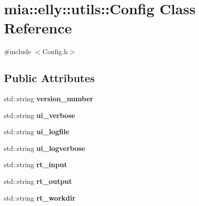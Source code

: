 \hypertarget{classmia_1_1elly_1_1utils_1_1_config}{\section{mia\-:\-:elly\-:\-:utils\-:\-:Config Class Reference}
\label{classmia_1_1elly_1_1utils_1_1_config}
}


{\ttfamily \#include $<$Config.\-h$>$}

\subsection*{Public Attributes}
\begin{DoxyCompactItemize}
\item 
\hypertarget{classmia_1_1elly_1_1utils_1_1_config_a39bcb2abda96acaf66b1c176e6ce63cb}{std\-::string {\bfseries version\-\_\-number}}\label{classmia_1_1elly_1_1utils_1_1_config_a39bcb2abda96acaf66b1c176e6ce63cb}

\item 
\hypertarget{classmia_1_1elly_1_1utils_1_1_config_a2c0b3e7d0478530afb5e031647f4d6ca}{std\-::string {\bfseries ui\-\_\-verbose}}\label{classmia_1_1elly_1_1utils_1_1_config_a2c0b3e7d0478530afb5e031647f4d6ca}

\item 
\hypertarget{classmia_1_1elly_1_1utils_1_1_config_a6a6fd92e60395b6cf875ed8a6782e29b}{std\-::string {\bfseries ui\-\_\-logfile}}\label{classmia_1_1elly_1_1utils_1_1_config_a6a6fd92e60395b6cf875ed8a6782e29b}

\item 
\hypertarget{classmia_1_1elly_1_1utils_1_1_config_aa6cf2371478ffbe27d74a489f102d006}{std\-::string {\bfseries ui\-\_\-logverbose}}\label{classmia_1_1elly_1_1utils_1_1_config_aa6cf2371478ffbe27d74a489f102d006}

\item 
\hypertarget{classmia_1_1elly_1_1utils_1_1_config_a6e0dd458d30629613b2fe131a1aca048}{std\-::string {\bfseries rt\-\_\-input}}\label{classmia_1_1elly_1_1utils_1_1_config_a6e0dd458d30629613b2fe131a1aca048}

\item 
\hypertarget{classmia_1_1elly_1_1utils_1_1_config_abab18c0b0e4819432851e764ee8b0091}{std\-::string {\bfseries rt\-\_\-output}}\label{classmia_1_1elly_1_1utils_1_1_config_abab18c0b0e4819432851e764ee8b0091}

\item 
\hypertarget{classmia_1_1elly_1_1utils_1_1_config_a4b826188e5713ed198ce32a43df0c784}{std\-::string {\bfseries rt\-\_\-workdir}}\label{classmia_1_1elly_1_1utils_1_1_config_a4b826188e5713ed198ce32a43df0c784}


\end{DoxyCompactItemize}
